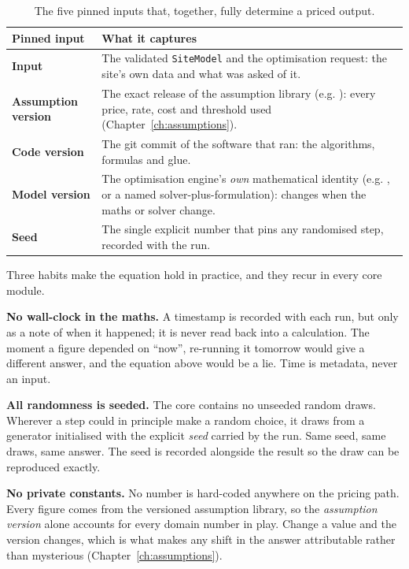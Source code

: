 \begin{table}[H]
\centering
\caption{The five pinned inputs that, together, fully determine a priced output.}
\label{tab:pins}
\small\sffamily
\begin{tabularx}{\textwidth}{@{}l L@{}}
\toprule
\textbf{Pinned input} & \textbf{What it captures} \\
\midrule
\textbf{Input} & The validated \texttt{SiteModel} and the optimisation request: the site's own data and what was asked of it. \\
\textbf{Assumption version} & The exact release of the assumption library (e.g. ): every price, rate, cost and threshold used (Chapter~\ref{ch:assumptions}). \\
\textbf{Code version} & The git commit of the software that ran: the algorithms, formulas and glue. \\
\textbf{Model version} & The optimisation engine's \emph{own} mathematical identity (e.g. , or a named solver-plus-formulation): changes when the maths or solver change. \\
\textbf{Seed} & The single explicit number that pins any randomised step, recorded with the run. \\
\bottomrule
\end{tabularx}
\end{table}

Three habits make the equation hold in practice, and they recur in every core module.

\textbf{No wall-clock in the maths.} A timestamp is recorded with each run, but only as a note of when it happened; it is never read back into a calculation. The moment a figure depended on ``now'', re-running it tomorrow would give a different answer, and the equation above would be a lie. Time is metadata, never an input.

\textbf{All randomness is seeded.} The core contains no unseeded random draws. Wherever a step could in principle make a random choice, it draws from a generator initialised with the explicit \emph{seed} carried by the run. Same seed, same draws, same answer. The seed is recorded alongside the result so the draw can be reproduced exactly.

\textbf{No private constants.} No number is hard-coded anywhere on the pricing path. Every figure comes from the versioned assumption library, so the \emph{assumption version} alone accounts for every domain number in play. Change a value and the version changes, which is what makes any shift in the answer attributable rather than mysterious (Chapter~\ref{ch:assumptions}).

